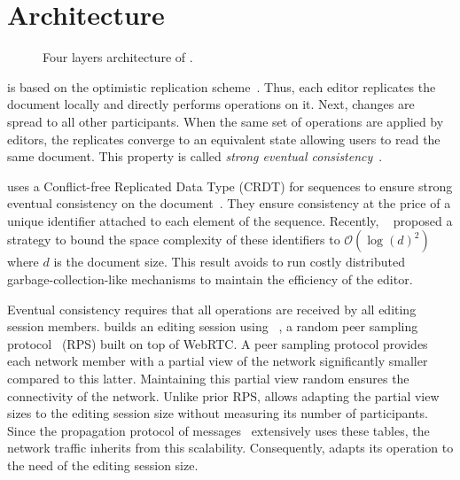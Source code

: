 
\section{Architecture}
\label{sec:architecture}

\begin{figure}
  \centering
  
  \caption{\label{fig:architecture} Four layers architecture of \CRATE.}
\end{figure}

\CRATE is based on the optimistic replication
scheme~\cite{saito2005optimistic}. Thus, each editor replicates the
document locally and directly performs operations on it. Next, changes
are spread to all other participants. When the same set of operations
are applied by editors, the replicates converge to an equivalent state
allowing users to read the same document.  This property is called
\emph{strong eventual consistency}~\cite{bailis2013eventual}.

\CRATE uses a Conflict-free Replicated Data Type (CRDT) for sequences to ensure
strong eventual consistency on the
document~\cite{shapiro2011comprehensive}. They ensure consistency at the price
of a unique identifier attached to each element of the sequence. Recently,
\LSEQ~\cite{nedelec2013lseq} proposed a strategy to bound the space complexity
of these identifiers to $\mathcal{O}(\log(d)^2)$ where $d$ is the document
size. This result avoids to run costly distributed garbage-collection-like
mechanisms to maintain the efficiency of the editor.

Eventual consistency requires that all operations are received by all editing
session members.  \CRATE builds an editing session using
\SPRAY~\cite{nedelec2015spray}, a random peer sampling
protocol~\cite{jelasity2007gossip} (RPS) built on top of WebRTC. A peer sampling
protocol provides each network member with a partial view of the network
significantly smaller compared to this latter. Maintaining this partial view
random ensures the connectivity of the network. Unlike prior RPS, \SPRAY allows
adapting the partial view sizes to the editing session size without
measuring its number of participants. Since the propagation protocol of
messages~\cite{birman1999bimodal} extensively uses these tables, the network
traffic inherits from this scalability. Consequently, \CRATE adapts its
operation to the need of the editing session size.


